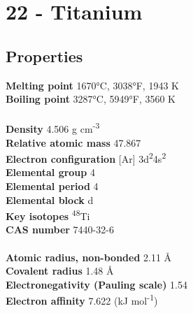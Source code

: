 \section{22 - Titanium}
\label{sec:elem-titanium}
\subsection{Properties}
\textbf{Melting point} 1670°C, 3038°F, 1943 K\\
\textbf{Boiling point} 3287°C, 5949°F, 3560 K\\
\\
\textbf{Density} 4.506 g cm\textsuperscript{-3}\\
\textbf{Relative atomic mass} 47.867\\
\textbf{Electron configuration} [Ar] 3d\textsuperscript{2}4s\textsuperscript{2}\\
\textbf{Elemental group} 4\\
\textbf{Elemental period} 4\\
\textbf{Elemental block} d\\
\textbf{Key isotopes} \textsuperscript{48}Ti\\
\textbf{CAS number} 7440-32-6\\
\\
\textbf{Atomic radius, non-bonded} 2.11 Å\\
\textbf{Covalent radius} 1.48 Å\\
\textbf{Electronegativity (Pauling scale)} 1.54\\
\textbf{Electron affinity} 7.622 (kJ mol\textsuperscript{-1})\\